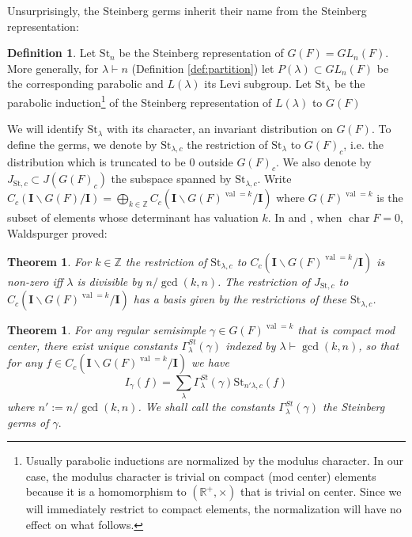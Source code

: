 \documentclass{amsart}
\numberwithin{equation}{section}
\newtheorem{theorem}[lemma]{Theorem}%
\theoremstyle{definition}
\newtheorem{definition}[lemma]{Definition}%
\def\16{{\bf 16}}
\def\1{{\bf 1}}
\newcommand{\bI}{\mathbf{I}}
\newcommand{\R}{{\mathbb R}}
\newcommand{\Z}{{\mathbb Z}}
\newcommand{\St}{\mathrm{St}}
\DeclareMathOperator{\cchar}{\text{char}}
\begin{document}
Unsurprisingly, the Steinberg germs inherit their name from the Steinberg representation:
\begin{definition}
Let $\St_n$ be the Steinberg representation of $G(F)=GL_n(F)$. More generally, for $\lambda\vdash n$ (Definition \ref{def:partition}) let $P(\lambda)\subset GL_n(F)$ be the corresponding parabolic and $L(\lambda)$ its Levi subgroup. Let $\St_{\lambda}$ be the parabolic induction\footnote{Usually parabolic inductions are normalized by the modulus character. In our case, the modulus character is trivial on compact (mod center) elements because it is a homomorphism to $(\R^+,\times)$ that is trivial on center. Since we will immediately restrict to compact elements, the normalization will have no effect on what follows.} 
of the Steinberg representation of $L(\lambda)$ to $G(F)$
\end{definition}
We will identify $\St_{\lambda}$ with its character, an invariant distribution on $G(F)$. 
To define the germs, we denote by $\St_{\lambda,c}$ the restriction of $\St_{\lambda}$ to $G(F)_c$, i.e. the distribution which is truncated to be $0$ outside $G(F)_c$. We also denote by $J_{\St,c}\subset J(G(F)_c)$ the subspace spanned by $\St_{\lambda,c}$. 
Write $C_c(\bI\backslash G(F)/\bI)=\bigoplus_{k\in\Z} C_c(\bI\backslash G(F)^{\operatorname{val}=k}/\bI)$ where $G(F)^{\operatorname{val}=k}$ is the subset of elements whose determinant has valuation $k$. 
In \cite[Proposition 2.4.]{W1} and \cite[Proposition III 4.]{W2}, when $\cchar F=0$, Waldspurger proved:


\begin{theorem}\label{thm:steinberg}
\label{Wal} For $k\in\Z$ the restriction of $\St_{\lambda,c}$ to $C_c(\bI\backslash G(F)^{\operatorname{val}=k}/\bI)$ is non-zero iff $\lambda$ is divisible by $n/\gcd(k,n)$. The restriction of $J_{\St,c}$ to $C_c(\bI\backslash G(F)^{\operatorname{val}=k}/\bI)$ has a basis given by the restrictions of these $\St_{\lambda,c}$.
\end{theorem}

\begin{theorem}\label{thm:steinberg2}
For any regular semisimple $\gamma\in G(F)^{\operatorname{val}=k}$ that is compact mod center, there exist unique constants $\Gamma_\lambda^{St}(\gamma)$ indexed by $\lambda\vdash\gcd(k,n)$, so that for any $f\in C_c(\bI\backslash G(F)^{\operatorname{val}=k}/\bI)$ we have 
\begin{equation}\label{eq:St-germ}
I_\gamma(f)=\sum_{\lambda}\Gamma^{St}_\lambda(\gamma)\St_{n'\lambda,c}(f)
\end{equation}
where $n':=n/\gcd(k,n)$. We shall call the constants $\Gamma^{St}_\lambda(\gamma)$ the {\em Steinberg germs of }$\gamma.$
\end{theorem}
\end{document}
